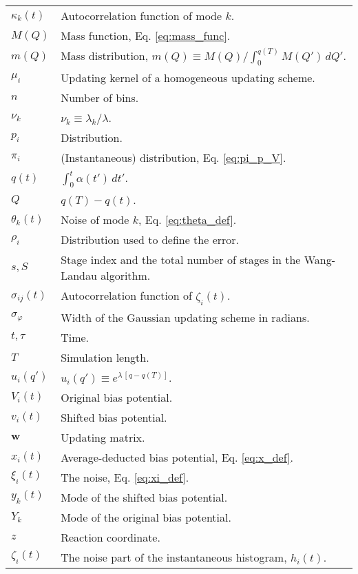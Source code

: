 \documentclass[reprint, superscriptaddress, floatfix]{revtex4-1}
\begin{document}
{\begin{table*}
\begin{tabular}{l | p{12cm} }
    $\kappa_k(t)$   &   Autocorrelation function of mode $k$. \\
    $M(Q)$          &   Mass function, Eq. \eqref{eq:mass_func}.   \\
    $m(Q)$          &   Mass distribution,
                        $m(Q) \equiv M(Q)/\int_0^{ q(T) } M(Q') \, dQ'$.  \\
    $\mu_i$         &   Updating kernel of a homogeneous updating scheme. \\
    $n$             &   Number of bins. \\
    $\nu_k$         &   $\nu_k \equiv \lambda_k / \lambda$. \\
    $p_i$           &   Distribution. \\
    $\pi_i$         &   (Instantaneous) distribution, Eq. \eqref{eq:pi_p_V}. \\
    $q(t)$          &   $\int_0^t \alpha(t') \, dt'$.  \\
    $Q$             &   $q(T) - q(t)$.  \\
    $\theta_k(t)$   &   Noise of mode $k$, Eq. \eqref{eq:theta_def}. \\
    $\rho_i$        &   Distribution used to define the error. \\
    $s, S$          &   Stage index and the total number of stages in the Wang-Landau algorithm. \\
    $\sigma_{ij}(t)$   &   Autocorrelation function of $\zeta_i(t)$. \\
    $\sigma_\varphi$   &   Width of the Gaussian updating scheme in radians. \\
    $t, \tau$       &   Time. \\
    $T$             &   Simulation length. \\
    $u_i(q')$       &   $u_i(q') \equiv e^{\lambda \, [q - q(T)]}$. \\
    $V_i(t)$        &   Original bias potential. \\
    $v_i(t)$        &   Shifted bias potential. \\
    $\mathbf w$     &   Updating matrix. \\
    $x_i(t)$        &   Average-deducted bias potential, Eq. \eqref{eq:x_def}. \\
    $\xi_i(t)$      &   The noise, Eq. \eqref{eq:xi_def}. \\
    $y_k(t)$        &   Mode of the shifted bias potential. \\
    $Y_k$           &   Mode of the original bias potential. \\
    $z$             &   Reaction coordinate. \\
    $\zeta_i(t)$    &   The noise part of the instantaneous histogram, $h_i(t)$.
  \end{tabular}
  \end{table*}
}


\end{document}
